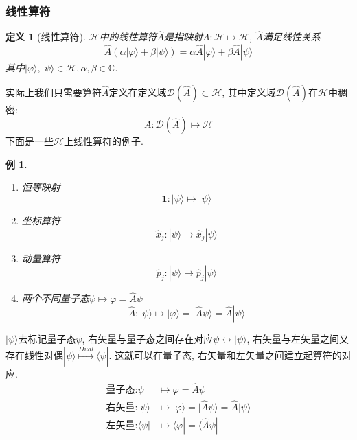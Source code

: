 \documentclass[a4paper,11pt]{article}
\newtheorem{definition}{\hspace{2em}定义}[section]
\newtheorem{example}{例}[section]
\begin{document}
\subsubsection{线性算符}
\begin{definition}[线性算符]
  $\mathcal{H}$中的线性算符$\hat{A}$是指映射$A:\mathcal{H}\longmapsto\mathcal{H}$, $\hat{A}$满足线性关系
\begin{equation*}
  \hat{A}(\alpha|\varphi\rangle+\beta|\psi\rangle)=\alpha \hat{A}|\varphi\rangle+\beta \hat{A}|\psi\rangle
\end{equation*}
其中$|\varphi\rangle, |\psi\rangle\in\mathcal{H},\alpha,\beta\in\mathbb{C}$.
\end{definition}
实际上我们只需要算符$\hat{A}$定义在定义域$\mathcal{D}(\hat{A})\subset\mathcal{H}$, 其中定义域$\mathcal{D}(\hat{A})$在$\mathcal{H}$中稠密:
\begin{equation*}
  A:\mathcal{D}(\hat{A})\longmapsto\mathcal{H}
\end{equation*}
下面是一些$\mathcal{H}$上线性算符的例子.
\begin{example}\quad
  \begin{enumerate}[1]
    \item 恒等映射
\begin{equation*}
  \mathbf{1}:|\psi\rangle\longmapsto|\psi\rangle
\end{equation*}
    \item 坐标算符
\begin{equation*}
  \hat{x}_j:|\psi\rangle\longmapsto \hat{x}_j|\psi\rangle
\end{equation*}
    \item 动量算符
\begin{equation*}
  \hat{p}_j:|\psi\rangle\longmapsto \hat{p}_j|\psi\rangle
\end{equation*}
    \item 两个不同量子态$\psi\longmapsto\varphi=\hat{A}\psi$
\begin{equation*}
  \hat{A}:|\psi\rangle\longmapsto|\varphi\rangle=|\hat{A}\psi\rangle=\hat{A}|\psi\rangle
\end{equation*}
  \end{enumerate}
\end{example}
$|\psi\rangle$去标记量子态$\psi$, 右矢量与量子态之间存在对应$\psi\longleftrightarrow|\psi\rangle$, 右矢量与左矢量之间又存在线性对偶$|\psi\rangle\stackrel{Dual}{\longmapsto}\langle\psi|$. 这就可以在量子态, 右矢量和左矢量之间建立起算符的对应.
\begin{equation*}
  \begin{split}
     \text{量子态:}\psi & \longmapsto\varphi=\hat{A}\psi \\
     \text{右矢量:}|\psi\rangle & \longmapsto|\varphi\rangle=|\hat{A}\psi\rangle=\hat{A}|\psi\rangle \\
     \text{左矢量:}\langle\psi| & \longmapsto\langle\varphi|=\langle\hat{A}\psi|
  \end{split}
\end{equation*}
\end{document}
